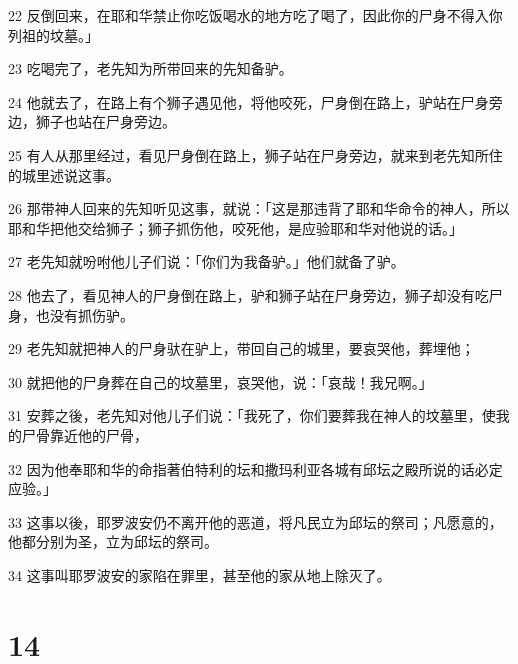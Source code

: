 \par 22 反倒回来，在耶和华禁止你吃饭喝水的地方吃了喝了，因此你的尸身不得入你列祖的坟墓。」
\par 23 吃喝完了，老先知为所带回来的先知备驴。
\par 24 他就去了，在路上有个狮子遇见他，将他咬死，尸身倒在路上，驴站在尸身旁边，狮子也站在尸身旁边。
\par 25 有人从那里经过，看见尸身倒在路上，狮子站在尸身旁边，就来到老先知所住的城里述说这事。
\par 26 那带神人回来的先知听见这事，就说：「这是那违背了耶和华命令的神人，所以耶和华把他交给狮子；狮子抓伤他，咬死他，是应验耶和华对他说的话。」
\par 27 老先知就吩咐他儿子们说：「你们为我备驴。」他们就备了驴。
\par 28 他去了，看见神人的尸身倒在路上，驴和狮子站在尸身旁边，狮子却没有吃尸身，也没有抓伤驴。
\par 29 老先知就把神人的尸身驮在驴上，带回自己的城里，要哀哭他，葬埋他；
\par 30 就把他的尸身葬在自己的坟墓里，哀哭他，说：「哀哉！我兄啊。」
\par 31 安葬之後，老先知对他儿子们说：「我死了，你们要葬我在神人的坟墓里，使我的尸骨靠近他的尸骨，
\par 32 因为他奉耶和华的命指著伯特利的坛和撒玛利亚各城有邱坛之殿所说的话必定应验。」
\par 33 这事以後，耶罗波安仍不离开他的恶道，将凡民立为邱坛的祭司；凡愿意的，他都分别为圣，立为邱坛的祭司。
\par 34 这事叫耶罗波安的家陷在罪里，甚至他的家从地上除灭了。

\chapter{14}

